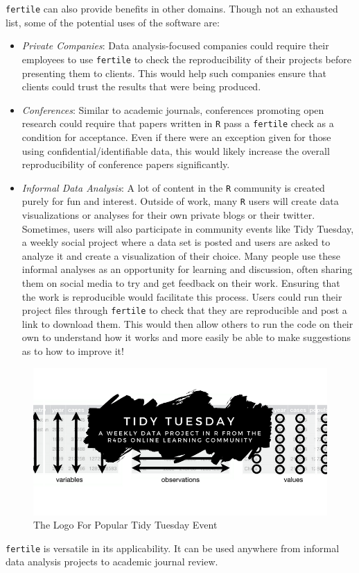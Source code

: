 \documentclass[12pt,twoside]{reedthesis}
\begin{document}
\texttt{fertile} can also provide benefits in other domains. Though not an exhausted list, some of the potential uses of the software are:
\begin{itemize}
\item
  \emph{Private Companies}: Data analysis-focused companies could require their employees to use \texttt{fertile} to check the reproducibility of their projects before presenting them to clients. This would help such companies ensure that clients could trust the results that were being produced.
\item
  \emph{Conferences}: Similar to academic journals, conferences promoting open research could require that papers written in \texttt{R} pass a \texttt{fertile} check as a condition for acceptance. Even if there were an exception given for those using confidential/identifiable data, this would likely increase the overall reproducibility of conference papers significantly.
\item
  \emph{Informal Data Analysis}: A lot of content in the \texttt{R} community is created purely for fun and interest. Outside of work, many \texttt{R} users will create data visualizations or analyses for their own private blogs or their twitter. Sometimes, users will also participate in community events like Tidy Tuesday, a weekly social project where a data set is posted and users are asked to analyze it and create a visualization of their choice. Many people use these informal analyses as an opportunity for learning and discussion, often sharing them on social media to try and get feedback on their work. Ensuring that the work is reproducible would facilitate this process. Users could run their project files through \texttt{fertile} to check that they are reproducible and post a link to download them. This would then allow others to run the code on their own to understand how it works and more easily be able to make suggestions as to how to improve it!
\end{itemize}
\begin{figure}
\includegraphics[width=1\linewidth]{figure/tidytuesday} \caption{The Logo For Popular Tidy Tuesday Event}\label{fig:unnamed-chunk-74}
\end{figure}
\texttt{fertile} is versatile in its applicability. It can be used anywhere from informal data analysis projects to academic journal review.
\end{document}
